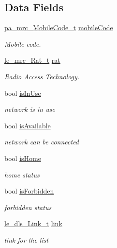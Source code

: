 \subsection*{Data Fields}
\begin{DoxyCompactItemize}
\item 
\hyperlink{structpa__mrc___mobile_code__t}{pa\+\_\+mrc\+\_\+\+Mobile\+Code\+\_\+t} \hyperlink{structpa__mrc___scan_information__t_abfca60d4149830903e44a7955f746405}{mobile\+Code}
\begin{DoxyCompactList}\small\item\em Mobile code. \end{DoxyCompactList}\item 
\hyperlink{le__mrc__interface_8h_aaf23906c37ad59fb96a8a48f7fab5b43}{le\+\_\+mrc\+\_\+\+Rat\+\_\+t} \hyperlink{structpa__mrc___scan_information__t_a5749af30ae56c054d1cd05f32132cfa2}{rat}
\begin{DoxyCompactList}\small\item\em Radio Access Technology. \end{DoxyCompactList}\item 
bool \hyperlink{structpa__mrc___scan_information__t_a9c56fa374999633566f926807a9cd29e}{is\+In\+Use}
\begin{DoxyCompactList}\small\item\em network is in use \end{DoxyCompactList}\item 
bool \hyperlink{structpa__mrc___scan_information__t_a231ac56bf18787f7cf7489a4fe7814b3}{is\+Available}
\begin{DoxyCompactList}\small\item\em network can be connected \end{DoxyCompactList}\item 
bool \hyperlink{structpa__mrc___scan_information__t_a8107e86b1981d8cffa16c41f1d759ac9}{is\+Home}
\begin{DoxyCompactList}\small\item\em home status \end{DoxyCompactList}\item 
bool \hyperlink{structpa__mrc___scan_information__t_a0a6c47a58234e441ce95202247b85abb}{is\+Forbidden}
\begin{DoxyCompactList}\small\item\em forbidden status \end{DoxyCompactList}\item 
\hyperlink{structle__dls___link__t}{le\+\_\+dls\+\_\+\+Link\+\_\+t} \hyperlink{structpa__mrc___scan_information__t_acba83a4fa24e19494ce09b802805aa5b}{link}
\begin{DoxyCompactList}\small\item\em link for the list \end{DoxyCompactList}\end{DoxyCompactItemize}


